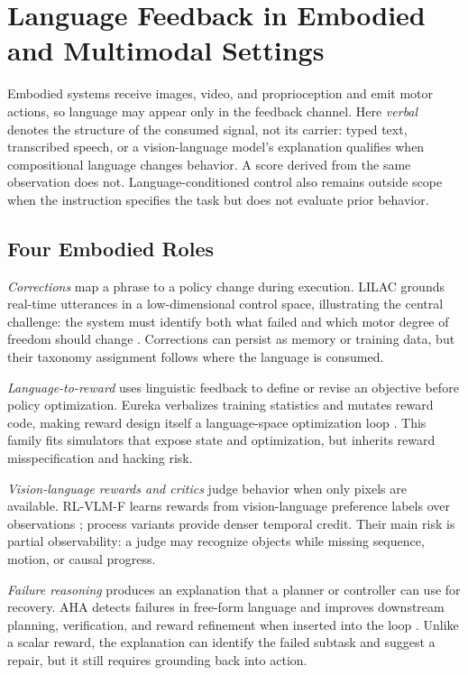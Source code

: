 \section{Language Feedback in Embodied and Multimodal Settings}
\label{sec:embodied}

Embodied systems receive images, video, and proprioception and emit motor actions, so language may appear only in the feedback channel. Here \emph{verbal} denotes the structure of the consumed signal, not its carrier: typed text, transcribed speech, or a vision-language model's explanation qualifies when compositional language changes behavior. A score derived from the same observation does not. Language-conditioned control also remains outside scope when the instruction specifies the task but does not evaluate prior behavior.

\subsection{Four Embodied Roles}
\label{subsec:robot-corrections}

\emph{Corrections} map a phrase to a policy change during execution. LILAC grounds real-time utterances in a low-dimensional control space, illustrating the central challenge: the system must identify both what failed and which motor degree of freedom should change \citep{cui2023no}. Corrections can persist as memory or training data, but their taxonomy assignment follows where the language is consumed.

\emph{Language-to-reward} uses linguistic feedback to define or revise an objective before policy optimization. Eureka verbalizes training statistics and mutates reward code, making reward design itself a language-space optimization loop \citep{ma2024eureka}. This family fits simulators that expose state and optimization, but inherits reward misspecification and hacking risk.

\emph{Vision-language rewards and critics} judge behavior when only pixels are available. RL-VLM-F learns rewards from vision-language preference labels over observations \citep{wang2024rlvlmf}; process variants provide denser temporal credit. Their main risk is partial observability: a judge may recognize objects while missing sequence, motion, or causal progress.

\emph{Failure reasoning} produces an explanation that a planner or controller can use for recovery. AHA detects failures in free-form language and improves downstream planning, verification, and reward refinement when inserted into the loop \citep{duan2024aha}. Unlike a scalar reward, the explanation can identify the failed subtask and suggest a repair, but it still requires grounding back into action.

